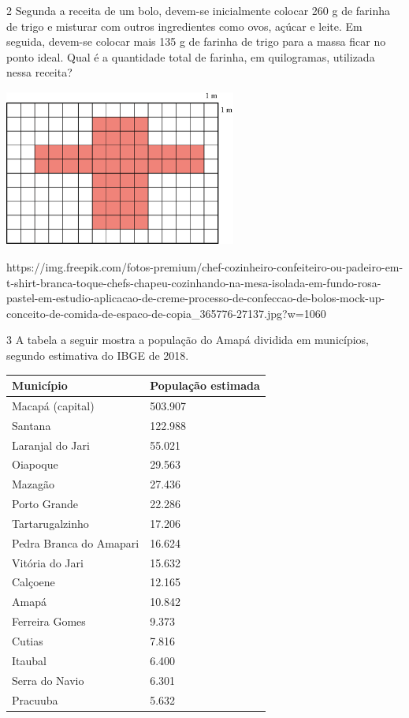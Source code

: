 \begin{mdframed}[linewidth=2pt,linecolor=salmao,roundcorner=2pt]
\vspace{10cm}
\end{mdframed}

\num{2} Segunda a receita de um bolo, devem-se inicialmente colocar 260 g de farinha
de trigo e misturar com outros ingredientes como ovos, açúcar e leite.
Em seguida, devem-se colocar mais 135 g de farinha de trigo para a massa
ficar no ponto ideal. Qual é a quantidade total de farinha, em quilogramas,
utilizada nessa receita?

\includegraphics[width=3.00000in,height=2.02528in]{media/image32.png}


https://img.freepik.com/fotos-premium/chef-cozinheiro-confeiteiro-ou-padeiro-em-t-shirt-branca-toque-chefs-chapeu-cozinhando-na-mesa-isolada-em-fundo-rosa-pastel-em-estudio-aplicacao-de-creme-processo-de-confeccao-de-bolos-mock-up-conceito-de-comida-de-espaco-de-copia\_365776-27137.jpg?w=1060

\begin{mdframed}[linewidth=2pt,linecolor=salmao,roundcorner=2pt]
\vspace{3cm}
\end{mdframed}

\num{3} A tabela a seguir mostra a população do Amapá dividida em municípios, segundo estimativa do IBGE de 2018.

\begin{longtable}[]{@{}ll@{}}
\toprule
Município & População estimada\tabularnewline
\midrule
\endhead
Macapá (capital) & 503.907\tabularnewline
Santana & 122.988\tabularnewline
Laranjal do Jari & 55.021\tabularnewline
Oiapoque & 29.563\tabularnewline
Mazagão & 27.436\tabularnewline
Porto Grande & 22.286\tabularnewline
Tartarugalzinho & 17.206\tabularnewline
Pedra Branca do Amapari & 16.624\tabularnewline
Vitória do Jari & 15.632\tabularnewline
Calçoene & 12.165\tabularnewline
Amapá & 10.842\tabularnewline
Ferreira Gomes & 9.373\tabularnewline
Cutias & 7.816\tabularnewline
Itaubal & 6.400\tabularnewline
Serra do Navio & 6.301\tabularnewline
Pracuuba & 5.632\tabularnewline
\bottomrule
\end{longtable}

